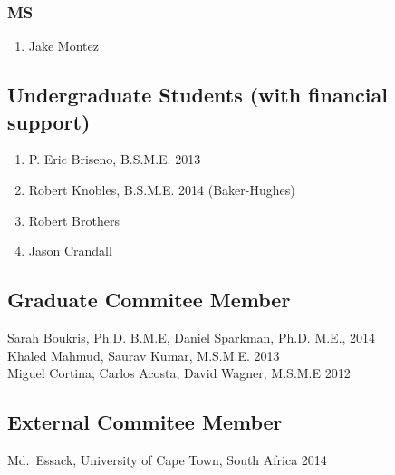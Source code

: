 \subsubsection*{MS}
\begin{enumerate}
  \item Jake Montez
\end{enumerate}

\subsection*{Undergraduate Students (with financial support)}
  \begin{enumerate}
    \item P. Eric Briseno, B.S.M.E. 2013
    \item Robert Knobles, B.S.M.E. 2014 (Baker-Hughes)
    \item Robert Brothers
    \item Jason Crandall
  \end{enumerate}

\subsection*{Graduate Commitee Member}
Sarah Boukris, Ph.D. B.M.E, Daniel Sparkman, Ph.D. M.E., 2014 \\
Khaled Mahmud, Saurav Kumar, M.S.M.E. 2013 \\
Miguel Cortina, Carlos Acosta, David Wagner, M.S.M.E 2012 
\subsection*{External Commitee Member}
Md.~Essack, University of Cape Town, South Africa 2014


